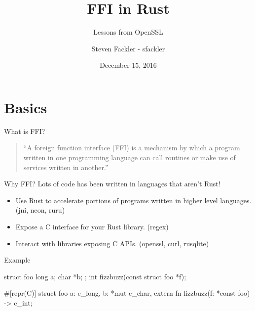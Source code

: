 \documentclass{beamer}
\title{FFI in Rust}
\subtitle{Lessons from OpenSSL}
\author[sfackler]{Steven Fackler - sfackler}
\date{December 15, 2016}
\begin{document}

\frame{\titlepage}

\frame{\tableofcontents}

\section{Basics}

\begin{frame}{What is FFI?}
    \begin{quote}
        ``A foreign function interface (FFI) is a mechanism by which a program written in one programming language can call routines or make use of services written in another.''
    \end{quote}
\end{frame}

\begin{frame}{Why FFI?}
    Lots of code has been written in languages that aren't Rust!

    \begin{itemize}
        \item Use Rust to accelerate portions of programs written in higher level languages. (jni, neon, ruru)
        \item Expose a C interface for your Rust library. (regex)
        \item Interact with libraries exposing C APIs. (openssl, curl, rusqlite)
    \end{itemize}
\end{frame}

\begin{frame}[fragile]{Example}
    \begin{ccode}
struct foo {
    long a;
    char *b;
};
int fizzbuzz(const struct foo *f);
    \end{ccode}
    \vspace{10pt}
    \begin{rustcode}
#[repr(C)]
struct foo {
    a: c_long,
    b: *mut c_char,
}
extern {
    fn fizzbuzz(f: *const foo) -> c_int;
}
    \end{rustcode}
\end{frame}
\end{document}
